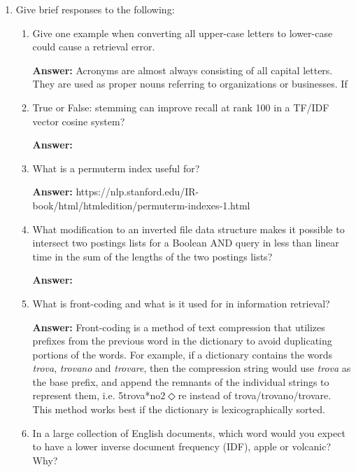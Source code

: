 \documentclass[11pt]{article}
\begin{document}
\begin{enumerate}
\begin{enumerate}
        \end{enumerate}

  \item Give brief responses to the following:
        \begin{enumerate}
          \item Give one example when converting all upper-case letters to lower-case could cause a retrieval error.

                \textbf{Answer:} Acronyms are almost always consisting of all capital letters. They are used as proper nouns referring to organizations or businesses. If

          \item True or False: stemming can improve recall at rank 100 in a TF/IDF vector cosine system?

                \textbf{Answer:}

          \item What is a permuterm index useful for?

                \textbf{Answer:} https://nlp.stanford.edu/IR-book/html/htmledition/permuterm-indexes-1.html

          \item What modification to an inverted file data structure makes it possible to intersect two postings lists for a Boolean AND query in less than linear time in the sum of the lengths of the two postings lists?

                \textbf{Answer:}

          \item What is front-coding and what is it used for in information retrieval?

                \textbf{Answer:} Front-coding is a method of text compression that utilizes prefixes from the previous word in the dictionary to avoid duplicating portions of the words. For example, if a dictionary contains the words \textit{trova}, \textit{trovano} and \textit{trovare}, then the compression string would use \textit{trova} as the base prefix, and append the remnants of the individual strings to represent them, i.e. 5trova*no2$\Diamond$re instead of trova/trovano/trovare. This method works best if the dictionary is lexicographically sorted.

          \item In a large collection of English documents, which word would you expect to have a lower inverse document frequency (IDF), apple or volcanic? Why?


\end{enumerate}
\end{enumerate}
\end{document}
